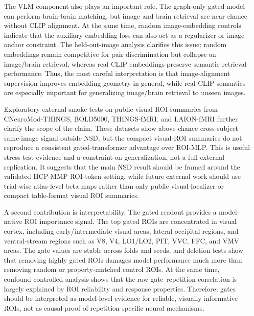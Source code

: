 \documentclass{article}
\begin{document}
The VLM component also plays an important role. The graph-only gated model can perform brain-brain matching, but image and brain retrieval are near chance without CLIP alignment. At the same time, random image-embedding controls indicate that the auxiliary embedding loss can also act as a regularizer or image-anchor constraint. The held-out-image analysis clarifies this issue: random embeddings remain competitive for pair discrimination but collapse on image/brain retrieval, whereas real CLIP embeddings preserve semantic retrieval performance. Thus, the most careful interpretation is that image-alignment supervision improves embedding geometry in general, while real CLIP semantics are especially important for generalizing image/brain retrieval to unseen images.

Exploratory external smoke tests on public visual-ROI summaries from CNeuroMod-THINGS, BOLD5000, THINGS-fMRI, and LAION-fMRI further clarify the scope of the claim. These datasets show above-chance cross-subject same-image signal outside NSD, but the compact visual-ROI summaries do not reproduce a consistent gated-transformer advantage over ROI-MLP. This is useful stress-test evidence and a constraint on generalization, not a full external replication. It suggests that the main NSD result should be framed around the validated HCP-MMP ROI-token setting, while future external work should use trial-wise atlas-level beta maps rather than only public visual-localizer or compact table-format visual ROI summaries.

A second contribution is interpretability. The gated readout provides a model-native ROI importance signal. The top gated ROIs are concentrated in visual cortex, including early/intermediate visual areas, lateral occipital regions, and ventral-stream regions such as V8, V4, LO1/LO2, PIT, VVC, FFC, and VMV areas. The gate values are stable across folds and seeds, and deletion tests show that removing highly gated ROIs damages model performance much more than removing random or property-matched control ROIs. At the same time, confound-controlled analysis shows that the raw gate--repetition correlation is largely explained by ROI reliability and response properties. Therefore, gates should be interpreted as model-level evidence for reliable, visually informative ROIs, not as causal proof of repetition-specific neural mechanisms.
\end{document}
